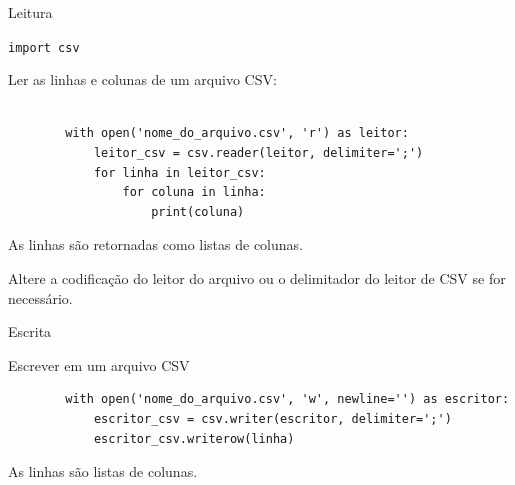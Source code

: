 \begin{frame}[containsverbatim]{Leitura}
	
	\texttt{import csv}
	
	Ler as linhas e colunas de um arquivo CSV:
	
	\begin{verbatim}		
		
		with open('nome_do_arquivo.csv', 'r') as leitor:			
			leitor_csv = csv.reader(leitor, delimiter=';')  
			for linha in leitor_csv:
				for coluna in linha:						
					print(coluna)
	\end{verbatim}
	
	As linhas são retornadas como listas de colunas.
	
	Altere a codificação do leitor do arquivo ou o delimitador do leitor de CSV se for necessário.
	
\end{frame}

\begin{frame}[containsverbatim]{Escrita}
	
	
	Escrever em um arquivo CSV
	
	\begin{verbatim}				
		with open('nome_do_arquivo.csv', 'w', newline='') as escritor:			
			escritor_csv = csv.writer(escritor, delimiter=';')  
			escritor_csv.writerow(linha)
	\end{verbatim}
	
	As linhas são listas de colunas.
\end{frame}



